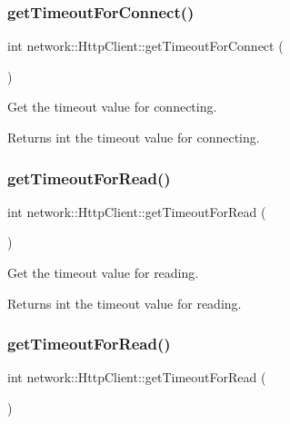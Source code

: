 \subsubsection{\texorpdfstring{get\+Timeout\+For\+Connect()}{getTimeoutForConnect()}\hspace{0.1cm}{\footnotesize\ttfamily [2/2]}}
{\footnotesize\ttfamily int network\+::\+Http\+Client\+::get\+Timeout\+For\+Connect (\begin{DoxyParamCaption}{ }\end{DoxyParamCaption})}

Get the timeout value for connecting.

\begin{DoxyReturn}{Returns}
int the timeout value for connecting. 
\end{DoxyReturn}
\mbox{\label{classnetwork_1_1HttpClient_a3398cc5ce8e6780267cd9227425331f5}} 
\subsubsection{\texorpdfstring{get\+Timeout\+For\+Read()}{getTimeoutForRead()}\hspace{0.1cm}{\footnotesize\ttfamily [1/2]}}
{\footnotesize\ttfamily int network\+::\+Http\+Client\+::get\+Timeout\+For\+Read (\begin{DoxyParamCaption}{ }\end{DoxyParamCaption})}

Get the timeout value for reading.

\begin{DoxyReturn}{Returns}
int the timeout value for reading. 
\end{DoxyReturn}
\mbox{\label{classnetwork_1_1HttpClient_a3398cc5ce8e6780267cd9227425331f5}} 
\subsubsection{\texorpdfstring{get\+Timeout\+For\+Read()}{getTimeoutForRead()}\hspace{0.1cm}{\footnotesize\ttfamily [2/2]}}
{\footnotesize\ttfamily int network\+::\+Http\+Client\+::get\+Timeout\+For\+Read (\begin{DoxyParamCaption}{ }\end{DoxyParamCaption})}

